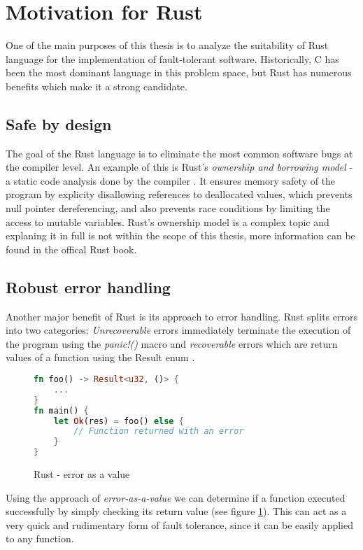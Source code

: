 \section{Motivation for Rust}
One of the main purposes of this thesis is to analyze the suitability of Rust language for the implementation of fault-tolerant software. Historically, C has been the most dominant language in this problem space, but Rust has numerous benefits which make it a strong candidate.

\subsection{Safe by design}
The goal of the Rust language is to eliminate the most common software bugs at the compiler level. An example of this is Rust's \textit{ownership and borrowing model} - a static code analysis done by the compiler \cite{rust_book:ownership}. It ensures memory safety of the program by explicity disallowing references to deallocated values, which prevents null pointer dereferencing, and also prevents race conditions by limiting the access to mutable variables. Rust's ownership model is a complex topic and explaning it in full is not within the scope of this thesis, more information can be found in the offical Rust book.

\subsection{Robust error handling}
Another major benefit of Rust is its approach to error handling. Rust splits errors into two categories: \textit{Unrecoverable} errors immediately terminate the execution of the program using the \textit{panic!()} macro and \textit{recoverable} errors which are return values of a function using the Result enum \cite{rust_book:error_handling}.

\begin{figure}[!h]
\begin{lstlisting}[language=Rust]
fn foo() -> Result<u32, ()> {
    ...
}
fn main() {
    let Ok(res) = foo() else {
        // Function returned with an error
    }
}
\end{lstlisting}
\caption{Rust - error as a value}
\label{fig:rust_error}
\end{figure}

Using the approach of \textit{error-as-a-value} we can determine if a function executed successfully by simply checking its return value (see figure \ref{fig:rust_error}). This can act as a very quick and rudimentary form of fault tolerance, since it can be easily applied to any function.

